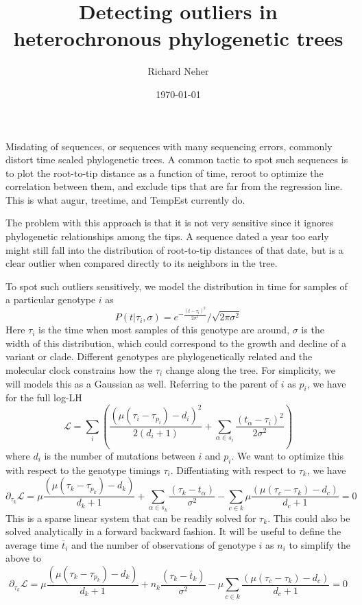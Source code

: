 \documentclass[aps,rmp, onecolumn]{revtex4}
\newcommand{\LH}{\mathcal{L}}
\begin{document}
\title{Detecting outliers in heterochronous phylogenetic trees}
\author{Richard Neher}
\date{\today}
\maketitle
Misdating of sequences, or sequences with many sequencing errors, commonly distort time scaled phylogenetic trees.
A common tactic to spot such sequences is to plot the root-to-tip distance as a function of time, reroot to optimize the correlation between them, and exclude tips that are far from the regression line.
This is what augur, treetime, and TempEst currently do.

The problem with this approach is that it is not very sensitive since it ignores phylogenetic relationships among the tips.
A sequence dated a year too early might still fall into the distribution of root-to-tip distances of that date, but is a clear outlier when compared directly to its neighbors in the tree.

To spot such outliers sensitively, we model the distribution in time for samples of a particular genotype $i$ as
\begin{equation}
    P(t|\tau_i, \sigma) = e^{-\frac{(t-\tau_i)^2}{2\sigma^2}}/\sqrt{2\pi\sigma^2}
\end{equation}
Here $\tau_i$ is the time when most samples of this genotype are around, $\sigma$ is the width of this distribution, which could correspond to the growth and decline of a variant or clade.
Different genotypes are phylogenetically related and the molecular clock constrains how the $\tau_i$ change along the tree.
For simplicity, we will models this as a Gaussian as well.
Referring to the parent of $i$ as $p_i$, we have for the full log-LH
\begin{equation}
    \LH  = \sum_i \left(\frac{(\mu(\tau_i - \tau_{p_i}) - d_i)^2}{2(d_i+1)} + \sum_{\alpha \in s_i} \frac{(t_\alpha-\tau_i)^2}{2\sigma^2} \right)
\end{equation}
where $d_i$ is the number of mutations between $i$ and $p_i$.
We want to optimize this with respect to the genotype timings $\tau_i$.
Diffentiating with respect to $\tau_k$, we have
\begin{equation}
    \partial_{\tau_k} \LH  = \mu\frac{(\mu(\tau_k - \tau_{p_k}) - d_k)}{d_k+1} + \sum_{\alpha \in s_k} \frac{(\tau_k-t_\alpha)}{\sigma^2} -  \sum_{c\in k} \mu\frac{(\mu(\tau_{c} - \tau_{k}) - d_c)}{d_c+1} = 0
\end{equation}
This is a sparse linear system that can be readily solved for $\tau_k$. This could also be solved analytically in a forward backward fashion.
It will be useful to define the average time $\bar{t}_i$ and the number of observations of genotype $i$ as $n_i$ to simplify the above to
\begin{equation}
    \partial_{\tau_k} \LH  = \mu\frac{(\mu(\tau_k - \tau_{p_k}) -  d_k)}{d_k+1} +  n_k\frac{(\tau_k-\bar{t}_k)}{\sigma^2} -  \mu\sum_{c\in k} \frac{(\mu(\tau_{c} - \tau_{k}) - d_c)}{d_c+1} = 0
\end{equation}
\end{document}
